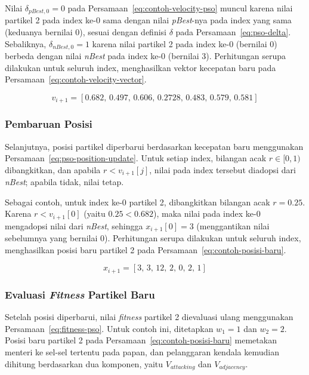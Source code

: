 Nilai $\delta_{pBest,0} = 0$ pada Persamaan~\ref{eq:contoh-velocity-pso} muncul karena nilai partikel 2 pada index ke-0 sama dengan nilai \textit{pBest}-nya pada index yang sama (keduanya bernilai $0$), sesuai dengan definisi $\delta$ pada Persamaan~\ref{eq:pso-delta}. Sebaliknya, $\delta_{nBest,0} = 1$ karena nilai partikel 2 pada index ke-0 (bernilai $0$) berbeda dengan nilai \textit{nBest} pada index ke-0 (bernilai $3$). Perhitungan serupa dilakukan untuk seluruh index, menghasilkan vektor kecepatan baru pada Persamaan~\ref{eq:contoh-velocity-vector}.

\begin{equation}
	v_{i+1} = [0.682,\, 0.497,\, 0.606,\, 0.2728,\, 0.483,\, 0.579,\, 0.581]
	\label{eq:contoh-velocity-vector}
\end{equation}

\subsubsection{Pembaruan Posisi}

Selanjutnya, posisi partikel diperbarui berdasarkan kecepatan baru menggunakan Persamaan~\ref{eq:pso-position-update}. Untuk setiap index, bilangan acak $r \in [0, 1)$ dibangkitkan, dan apabila $r < v_{i+1}[j]$, nilai pada index tersebut diadopsi dari \textit{nBest}; apabila tidak, nilai tetap.

Sebagai contoh, untuk index ke-0 partikel 2, dibangkitkan bilangan acak $r = 0.25$. Karena $r < v_{i+1}[0]$ (yaitu $0.25 < 0.682$), maka nilai pada index ke-0 mengadopsi nilai dari \textit{nBest}, sehingga $x_{i+1}[0] = 3$ (menggantikan nilai sebelumnya yang bernilai $0$). Perhitungan serupa dilakukan untuk seluruh index, menghasilkan posisi baru partikel 2 pada Persamaan~\ref{eq:contoh-posisi-baru}.

\begin{equation}
	x_{i+1} = [3,\, 3,\, 12,\, 2,\, 0,\, 2,\, 1]
	\label{eq:contoh-posisi-baru}
\end{equation}

\subsubsection{Evaluasi \textit{Fitness} Partikel Baru}

Setelah posisi diperbarui, nilai \textit{fitness} partikel 2 dievaluasi ulang menggunakan Persamaan~\ref{eq:fitness-pso}. Untuk contoh ini, ditetapkan $w_1 = 1$ dan $w_2 = 2$. Posisi baru partikel 2 pada Persamaan~\ref{eq:contoh-posisi-baru} memetakan menteri ke sel-sel tertentu pada papan, dan pelanggaran kendala kemudian dihitung berdasarkan dua komponen, yaitu $V_{\textit{attacking}}$ dan $V_{\textit{adjacency}}$.

